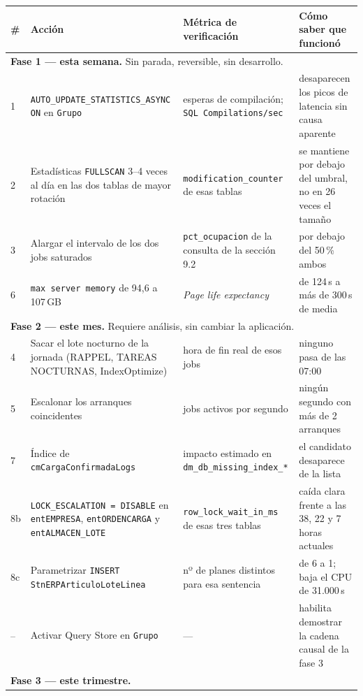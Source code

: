 \documentclass[11pt,a4paper]{article}
\newcommand{\cod}[1]{\texttt{\small #1}}
\begin{document}
\begin{longtable}{p{0.4cm}p{5.1cm}p{4.2cm}p{4.3cm}}
\toprule
\textbf{\#} & \textbf{Acción} & \textbf{Métrica de verificación} &
\textbf{Cómo saber que funcionó} \\
\midrule
\endhead
\multicolumn{4}{l}{\cellcolor{acento!10}\textbf{Fase 1 — esta semana.} Sin
parada, reversible, sin desarrollo.} \\
\midrule
1 & \cod{AUTO\_UPDATE\_STATISTICS\_ASYNC ON} en \cod{Grupo}
  & esperas de compilación; \cod{SQL Compilations/sec}
  & desaparecen los picos de latencia sin causa aparente \\
2 & Estadísticas \cod{FULLSCAN} 3--4 veces al día en las dos tablas de mayor
    rotación
  & \cod{modification\_counter} de esas tablas
  & se mantiene por debajo del umbral, no en 26 veces el tamaño \\
3 & Alargar el intervalo de los dos jobs saturados
  & \cod{pct\_ocupacion} de la consulta de la sección 9.2
  & por debajo del 50\,\% ambos \\
6 & \cod{max server memory} de 94,6 a 107\,GB
  & \emph{Page life expectancy}
  & de 124\,s a más de 300\,s de media \\
\midrule
\multicolumn{4}{l}{\cellcolor{acento!10}\textbf{Fase 2 — este mes.} Requiere
análisis, sin cambiar la aplicación.} \\
\midrule
4 & Sacar el lote nocturno de la jornada (RAPPEL, TAREAS NOCTURNAS,
    IndexOptimize)
  & hora de fin real de esos jobs
  & ninguno pasa de las 07:00 \\
5 & Escalonar los arranques coincidentes
  & jobs activos por segundo
  & ningún segundo con más de 2 arranques \\
7 & Índice de \cod{cmCargaConfirmadaLogs}
  & impacto estimado en \cod{dm\_db\_missing\_index\_*}
  & el candidato desaparece de la lista \\
8b & \cod{LOCK\_ESCALATION = DISABLE} en \cod{entEMPRESA},
     \cod{entORDENCARGA} y \cod{entALMACEN\_LOTE}
  & \cod{row\_lock\_wait\_in\_ms} de esas tres tablas
  & caída clara frente a las 38, 22 y 7 horas actuales \\
8c & Parametrizar \cod{INSERT StnERPArticuloLoteLinea}
  & nº de planes distintos para esa sentencia
  & de 6 a 1; baja el CPU de 31.000\,s \\
-- & Activar Query Store en \cod{Grupo}
  & ---
  & habilita demostrar la cadena causal de la fase 3 \\
\midrule
\multicolumn{4}{l}{\cellcolor{acento!10}\textbf{Fase 3 — este trimestre.}
}
\end{longtable}
\end{document}
